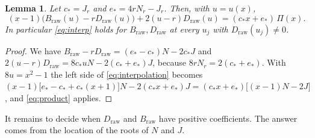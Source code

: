 \documentclass[11pt]{article}
\theoremstyle{plain}
\newtheorem{lemma}[theorem]{Lemma}
\theoremstyle{definition}
\theoremstyle{remark}
\numberwithin{equation}{section}
\newcommand{\raw}{\mathrm{raw}}
\newcommand{\cs}{c_\ast}
\newcommand{\es}{e_\ast}
\begin{document}
\begin{lemma}\label{lem:identity}
Let \(\cs=J_r\) and \(\es=4rN_r-J_r\). Then, with \(u=u(x)\),
\begin{equation}\label{eq:interpolation}
 (x-1)\bigl(B_{\raw}(u)-rD_{\raw}(u)\bigr)+2(u-r)D_{\raw}(u)=(\cs x+\es)\,\Pi(x).
\end{equation}
In particular \eqref{eq:interp} holds for \(B_{\raw},D_{\raw}\) at every \(u_j\) with
\(D_{\raw}(u_j)\ne0\).
\end{lemma}
\begin{proof}
We have \(B_{\raw}-rD_{\raw}=(\es-\cs)N-2\cs J\) and
\(2(u-r)D_{\raw}=8\cs uN-2(\cs+\es)J\), because \(8rN_r=2(\cs+\es)\). With \(8u=x^2-1\) the
left side of \eqref{eq:interpolation} becomes
\((x-1)\bigl[\es-\cs+\cs(x+1)\bigr]N-2(\cs x+\es)J=(\cs x+\es)\bigl[(x-1)N-2J\bigr]\), and
\eqref{eq:product} applies.
\end{proof}

It remains to decide when \(D_{\raw}\) and \(B_{\raw}\) have positive coefficients. The answer
comes from the location of the roots of \(N\) and \(J\).
\end{document}
